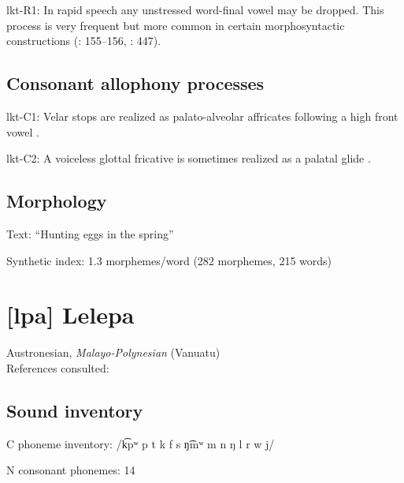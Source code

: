 {\begin{appendixdesc}
\item[lkt-R1:] In rapid speech any unstressed word-final vowel may be dropped. This process is very frequent but more common in certain morphosyntactic constructions (\citealt{Mirzayan2010}: 155--156, \citealt{RoodTaylor1996}: 447).
\end{appendixdesc}
\subsection*{Consonant allophony processes}
\begin{appendixdesc}

\item[lkt-C1:] Velar stops are realized as palato-alveolar affricates following a high front vowel \citep[6]{Ingham2003}.

\item[lkt-C2:] A voiceless glottal fricative is sometimes realized as a palatal glide \citep{Ingham2003}.
\end{appendixdesc}
\subsection*{Morphology}

\begin{appendixdesc}

\item[Text:] “Hunting eggs in the spring” \citep[95--96]{Ingham2003}

\item[Synthetic index:] 1.3 morphemes/word (282 morphemes, 215 words)
\end{appendixdesc}
\section*{[lpa] Lelepa}  %
Austronesian, \textit{Malayo-Polynesian} (Vanuatu)\medskip\\
References consulted: \citet{Lacrampe2014}

\subsection*{Sound inventory}
\begin{appendixdesc}

\item[C phoneme inventory:] /k͡pʷ p t k f s ŋ͡mʷ m n ŋ l r w j/

\item[N consonant phonemes:] 14


\end{appendixdesc}}
